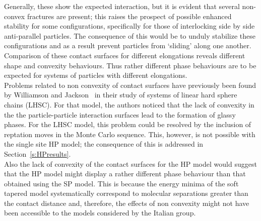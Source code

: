 Generally, these show the expected interaction, but it is evident that several non-convex
fractures are present; this raises the prospect of possible
enhanced stability for some
configurations, specifically for those of interlocking side by side anti-parallel particles. 
The consequence of  this would be to unduly stabilize 
these configurations and as a result prevent particles from `sliding' along one another.
Comparison of these contact surfaces for different elongations reveals different shape and
convexity behaviours. Thus rather different phase behaviours are to be expected for systems of 
particles with different elongations.\\
%
Problems related to non convexity of contact surfaces have previously been found by
Williamson and Jackson~\cite{WilliamsonJackson98} in their study of systems of linear hard 
sphere chains (LHSC). For that model, the authors noticed that the lack of convexity in the  
the particle-particle interaction surfaces lead to the formation of glassy phases. For the LHSC
model, this problem
could be resolved by the inclusion of reptation moves in the Monte Carlo sequence. 
This, however, is not possible with the single site HP model; the consequence of this is
addressed in Section~\ref{s:HPresults}.\\
%
Also the lack of convexity of the contact surfaces for the HP model would suggest that the HP
model might display a rather different phase behaviour than that obtained using
the SP model. This is because the energy minima of the soft tapered model systematically 
correspond to molecular separations greater than the contact distance and, therefore, the effects
of non convexity might not have been accessible to the models considered by the Italian group.




